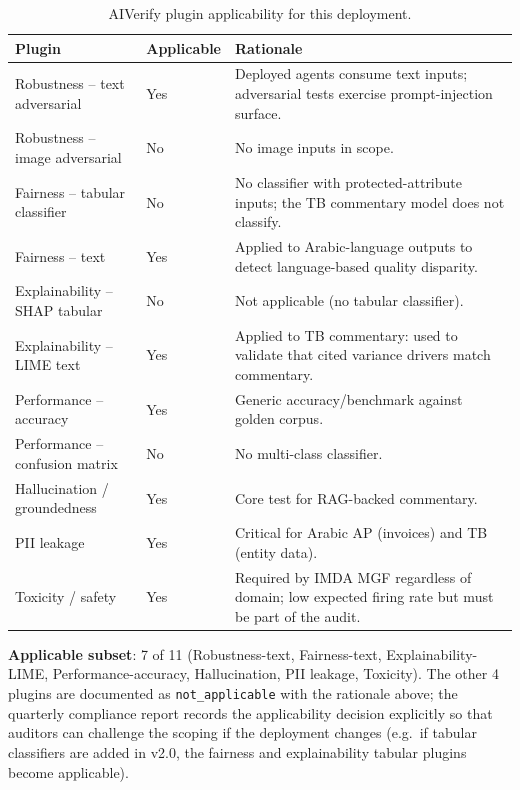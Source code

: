 \documentclass[11pt,a4paper,twoside]{report}
\begin{document}
\begin{table}[htbp]
\centering
\caption{AIVerify plugin applicability for this deployment.}
\label{tab:aiverify-subset}
\footnotesize
\begin{tabularx}{\linewidth}{@{}l l X@{}}
\toprule
\textbf{Plugin} & \textbf{Applicable} & \textbf{Rationale} \\ \midrule
Robustness -- text adversarial & Yes & Deployed agents consume text inputs; adversarial tests exercise prompt-injection surface. \\
Robustness -- image adversarial & No & No image inputs in scope. \\
Fairness -- tabular classifier & No & No classifier with protected-attribute inputs; the TB commentary model does not classify. \\
Fairness -- text & Yes & Applied to Arabic-language outputs to detect language-based quality disparity. \\
Explainability -- SHAP tabular & No & Not applicable (no tabular classifier). \\
Explainability -- LIME text & Yes & Applied to TB commentary: used to validate that cited variance drivers match commentary. \\
Performance -- accuracy & Yes & Generic accuracy/benchmark against golden corpus. \\
Performance -- confusion matrix & No & No multi-class classifier. \\
Hallucination / groundedness & Yes & Core test for RAG-backed commentary. \\
PII leakage & Yes & Critical for Arabic AP (invoices) and TB (entity data). \\
Toxicity / safety & Yes & Required by IMDA MGF regardless of domain; low expected firing rate but must be part of the audit. \\
\bottomrule
\end{tabularx}
\end{table}

\noindent
\textbf{Applicable subset}: 7 of 11 (Robustness-text, Fairness-text,
Explainability-LIME, Performance-accuracy, Hallucination, PII
leakage, Toxicity). The other 4 plugins are documented as
\texttt{not\_applicable} with the rationale above; the quarterly
compliance report records the applicability decision explicitly so
that auditors can challenge the scoping if the deployment changes
(e.g.\ if tabular classifiers are added in v2.0, the fairness and
explainability tabular plugins become applicable).
\end{document}
